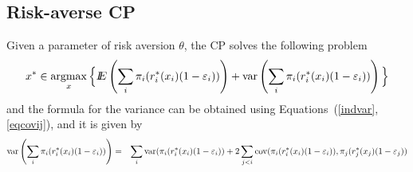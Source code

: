 \subsection{Risk-averse CP}
Given a parameter of risk aversion $\theta$, the CP solves the following problem
\[x^*\in\mathop{\rm argmax}_{x} \Big\lbrace {I\kern-.35em E}\left(\sum_i \pi_i(r^*_i(x_i)(1-\varepsilon_i))\right) + {\mathop{\rm var}\nolimits}\left(\sum_i \pi_i(r^*_i(x_i)(1-\varepsilon_i))\right)\Big\rbrace\]
and the formula for the variance can be obtained using Equations~(\ref{indvar},\ref{eqcovij}), and it is given by
\begin{eqnarray*}
{\mathop{\rm var}\nolimits}\left(\sum_i \pi_i(r^*_i(x_i)(1-\varepsilon_i))\right)&=&\sum_i {\mathop{\rm var}\nolimits}(\pi_i(r^*_i(x_i)(1-\varepsilon_i))+2\sum_{j<i}{\mathop{\rm cov}\nolimits}(\pi_i(r^*_i(x_i)(1-\varepsilon_i)),\pi_j(r^*_j(x_j)(1-\varepsilon_j))\\
\end{eqnarray*}